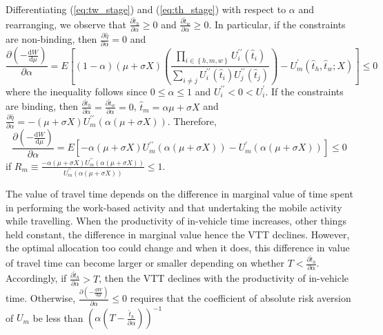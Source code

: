 \documentclass[12pt,a4paper,british]{article}
\makeatletter
\newenvironment{proof}[1][\proofname]{\par
    \normalfont\topsep6\p@\@plus6\p@\relax
    \trivlist
    \itemindent\parindent
    \item[\hskip\labelsep
          \scshape
      #1]\ignorespaces
  }{%
    \endtrivlist\@endpefalse
  }
\providecommand{\proofname}{Proof}
\makeatother
\begin{document}
\begin{proof}
Differentiating (\ref{eq:tw_stage}) and (\ref{eq:th_stage}) with respect to $\alpha$ and rearranging, we observe that $\frac{\partial\hat{t}_{h}}{\partial\alpha} \geq 0$ and $\frac{\partial\hat{t}_{w}}{\partial\alpha}\geq0$. In particular, if the constraints are non-binding, then $\frac{\partial\hat{\eta}}{\partial\alpha}=0 $ and
\begin{equation*}
\frac{\partial\left(-\frac{\mathrm{d}W}{\mathrm{d}\mu}\right)}{\partial\alpha} = E\left[\left(1-\alpha\right)  \left( \mu + \sigma X \right) \left(\frac{\prod_{i \in\left\{ h, m, w \right\}}U_{i}^{\prime\prime}\left(\hat{t}_{i}\right)}{\sum_{i\neq j}U_{i}^{\prime\prime}\left(\hat{t}_{i}\right)U_{j}^{\prime\prime}\left(\hat{t}_{j}\right)}\right)-U_{m}^{\prime}\left(\hat{t}_{h}, \hat{t}_{w}; X\right)\right] \leq 0
\end{equation*}
where the inequality follows since $0 \leq \alpha \leq 1$ and $U^{\prime\prime}_i < 0 < U^{\prime}_i$.  If the constraints are binding, then $\frac{\partial\hat{t}_{h}}{\partial\alpha}=\frac{\partial\hat{t}_{w}}{\partial\alpha}=0$, $\hat{t}_{m}=\alpha \mu + \sigma X$ and $\frac{\partial\hat{\eta}}{\partial\alpha}=-(\mu+\sigma X) U_{m}^{\prime\prime}\left(\alpha (\mu+\sigma X) \right)$. Therefore,
\begin{equation*}
\frac{\partial\left(-\frac{\mathrm{d}W}{\mathrm{d} \mu}\right)}{\partial\alpha}= E\left[-\alpha (\mu + \sigma X) U_{m}^{\prime\prime}\left(\alpha (\mu+\sigma X) \right)-U_{m}^{\prime}\left(\alpha (\mu+\sigma X) \right)\right] \leq 0
\end{equation*}
if $R_m \equiv \frac{-\alpha (\mu+\sigma X) U_m^{\prime\prime} \left(\alpha (\mu+\sigma X)\right)}{U_m^{\prime\prime} \left(\alpha (\mu+\sigma X)\right)} \leq 1$.
\end{proof}


The value of travel time depends on the difference in marginal value of time spent in performing the work-based activity and that undertaking the mobile activity while travelling. When the productivity of in-vehicle time increases, other things held constant, the difference in marginal value hence the VTT declines. However, the optimal allocation too could change and when it does, this difference in value of travel time can become larger or smaller depending on whether $T < \frac{\partial \hat{t}_h}{\partial \alpha}$. Accordingly, if $\frac{\partial \hat{t}_h}{\partial \alpha} > T$, then the VTT declines with the productivity of in-vehicle time. Otherwise, $\frac{\partial\left( -\frac{\mathrm{d}W }{\mathrm{d}\mu} \right)}{\partial\alpha} \leq 0$ requires that the coefficient of absolute risk aversion of $U_m$ be less than $\left( \alpha \left(T - \frac{\hat{t}_h}{\partial \alpha} \right) \right)^{-1}$
\end{document}
